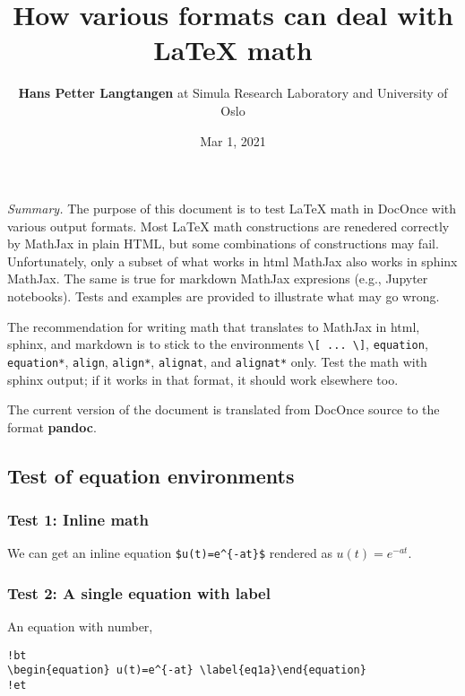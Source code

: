 \documentclass[]{article}
\title{How various formats can deal with LaTeX math}
\author{\textbf{Hans Petter Langtangen} at Simula Research Laboratory and
University of Oslo}
\date{Mar 1, 2021}
\begin{document}
\maketitle

\emph{Summary.} The purpose of this document is to test LaTeX math in
DocOnce with various output formats. Most LaTeX math constructions are
renedered correctly by MathJax in plain HTML, but some combinations of
constructions may fail. Unfortunately, only a subset of what works in
html MathJax also works in sphinx MathJax. The same is true for markdown
MathJax expresions (e.g., Jupyter notebooks). Tests and examples are
provided to illustrate what may go wrong.

The recommendation for writing math that translates to MathJax in html,
sphinx, and markdown is to stick to the environments
\texttt{\textbackslash{}{[}\ ...\ \textbackslash{}{]}},
\texttt{equation}, \texttt{equation*}, \texttt{align}, \texttt{align*},
\texttt{alignat}, and \texttt{alignat*} only. Test the math with sphinx
output; if it works in that format, it should work elsewhere too.

The current version of the document is translated from DocOnce source to
the format \textbf{pandoc}.

\subsection{Test of equation
environments}\label{test-of-equation-environments}

\subsubsection{Test 1: Inline math}\label{test-1-inline-math}

We can get an inline equation \texttt{\$u(t)=e\^{}\{-at\}\$} rendered as
\(u(t)=e^{-at}\).

\subsubsection{Test 2: A single equation with
label}\label{test-2-a-single-equation-with-label}

An equation with number,

\begin{verbatim}
!bt
\begin{equation} u(t)=e^{-at} \label{eq1a}\end{equation}
!et
\end{verbatim}
\end{document}
